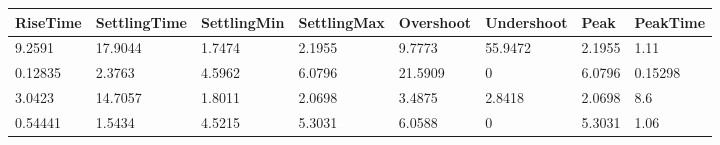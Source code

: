 \begin{tabular}{llllllll}
RiseTime & SettlingTime & SettlingMin & SettlingMax & Overshoot & Undershoot & Peak & PeakTime \\ 
\hline 
9.2591 & 17.9044 & 1.7474 & 2.1955 & 9.7773 & 55.9472 & 2.1955 & 1.11 \\ 
0.12835 & 2.3763 & 4.5962 & 6.0796 & 21.5909 & 0 & 6.0796 & 0.15298 \\ 
3.0423 & 14.7057 & 1.8011 & 2.0698 & 3.4875 & 2.8418 & 2.0698 & 8.6 \\ 
0.54441 & 1.5434 & 4.5215 & 5.3031 & 6.0588 & 0 & 5.3031 & 1.06 \\ 
\hline 
\end{tabular}
